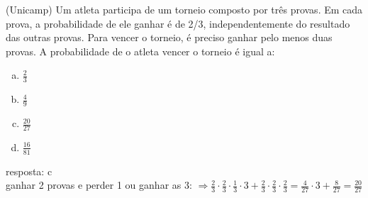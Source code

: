 \begin{ex}
   (Unicamp) Um atleta participa de um torneio composto por três provas. Em cada prova, a probabilidade de ele ganhar é de 2/3, independentemente do resultado das outras provas. Para vencer o torneio, é preciso ganhar pelo menos duas provas. A probabilidade de o atleta vencer o torneio é igual a:
    \begin{enumerate} [(a)]
        \item $\frac{2}{3}$
        \item $\frac{4}{9}$
        \item $\frac{20}{27}$
        \item $\frac{16}{81}$
    \end{enumerate}
      \begin{sol}
       resposta: c \\
       ganhar 2 provas e perder 1 ou ganhar as 3: \hspace{0,5cm}
       $\Longrightarrow \frac{2}{3}\cdot\frac{2}{3}\cdot\frac{1}{3}\cdot3+\frac{2}{3}\cdot\frac{2}{3}\cdot\frac{2}{3}=\frac{4}{27}\cdot3+\frac{8}{27}=\frac{20}{27}$
      \end{sol}
  \end{ex}